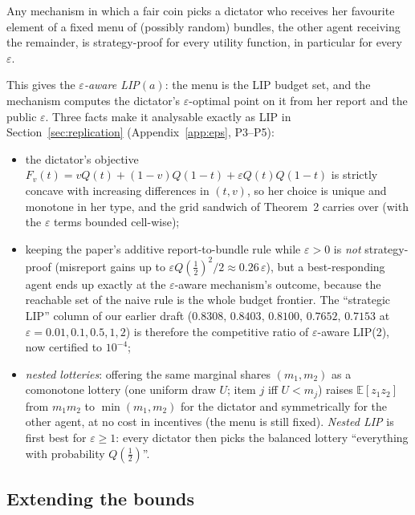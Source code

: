 \begin{proposition}\label{prop:menu}
Any mechanism in which a fair coin picks a dictator who receives her favourite element of a
fixed menu of (possibly random) bundles, the other agent receiving the remainder, is
strategy-proof for every utility function, in particular for every $\varepsilon$.
\end{proposition}
This gives the \emph{$\varepsilon$-aware LIP$(a)$}: the menu is the LIP budget set, and the
mechanism computes the dictator's $\varepsilon$-optimal point on it from her report and the public
$\varepsilon$. Three facts make it analysable exactly as LIP in Section~\ref{sec:replication}
(Appendix~\ref{app:eps}, P3--P5):
\begin{itemize}[nosep]
\item the dictator's objective $F_v(t)=vQ(t)+(1-v)Q(1-t)+\varepsilon Q(t)Q(1-t)$ is strictly concave
  with increasing differences in $(t,v)$, so her choice is unique and monotone in her type, and
  the grid sandwich of Theorem~2 carries over (with the $\varepsilon$ terms bounded cell-wise);
\item keeping the paper's additive report-to-bundle rule while $\varepsilon>0$ is \emph{not}
  strategy-proof (misreport gains up to $\varepsilon Q(\tfrac12)^2/2\approx0.26\,\varepsilon$), but a
  best-responding agent ends up exactly at the $\varepsilon$-aware mechanism's outcome, because
  the reachable set of the naive rule is the whole budget frontier. The ``strategic LIP'' column
  of our earlier draft ($0.8308,\,0.8403,\,0.8100,\,0.7652,\,0.7153$ at $\varepsilon=0.01,0.1,0.5,1,2$)
  is therefore the competitive ratio of $\varepsilon$-aware LIP(2), now certified to $10^{-4}$;
\item \emph{nested lotteries}: offering the same marginal shares $(m_1,m_2)$ as a comonotone
  lottery (one uniform draw $U$; item $j$ iff $U<m_j$) raises $\mathbb E[z_1z_2]$ from $m_1m_2$ to
  $\min(m_1,m_2)$ for the dictator and symmetrically for the other agent, at no cost in incentives
  (the menu is still fixed). \emph{Nested LIP} is first best for $\varepsilon\ge1$: every dictator
  then picks the balanced lottery ``everything with probability $Q(\tfrac12)$''.
\end{itemize}

\subsection{Extending the bounds}

